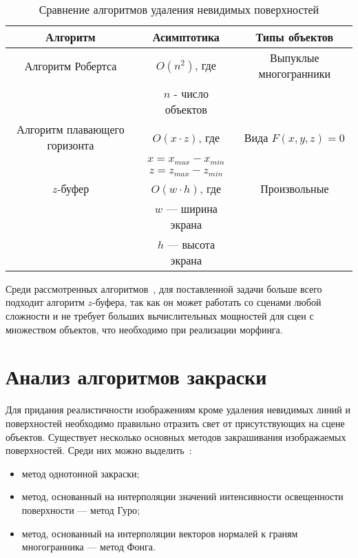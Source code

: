 \begin{table}[ht]
	\small
	\begin{center}
		\begin{threeparttable}
			\caption{Сравнение алгоритмов удаления невидимых поверхностей}
			\label{tbl:test_rem_faces}
			\begin{tabular}{|c|c|c|}
				\hline
				\bfseries Алгоритм & \bfseries Асимптотика & \bfseries Типы объектов \\
				\hline
				Алгоритм Робертса & $O(n^2)$, где & Выпуклые многогранники \\
				& $n$ - число объектов & \\
				\hline
				Алгоритм плавающего горизонта & $O(x \cdot z)$, где & Вида $F(x, y, z) = 0$ \\
				& $x = x_{max} - x_{min}$ & \\
				& $z = z_{max} - z_{min}$ & \\
				\hline
				$z$-буфер & $O(w \cdot h)$, где & Произвольные \\
				& $w$ --- ширина экрана & \\
				& $h$ --- высота экрана & \\
				\hline
			\end{tabular}
		\end{threeparttable}
	\end{center}
\end{table}

Среди рассмотренных алгоритмов~\cite{REMOVE_FACES, ZBuff}, для поставленной задачи больше всего подходит алгоритм $z$-буфера, так как он может работать со сценами любой сложности и не требует больших вычислительных мощностей для сцен с множеством объектов, что необходимо при реализации морфинга.

\newpage

\section{Анализ алгоритмов закраски}

Для придания реалистичности изображениям кроме удаления невидимых линий и поверхностей необходимо правильно отразить свет от присутствующих на сцене объектов. Существует несколько основных методов закрашивания изображаемых поверхностей. Среди них можно выделить~\cite{FILL_FACES}:

\begin{itemize}[label*=---]
	\item метод однотонной закраски;
	\item метод, основанный на интерполяции значений интенсивности освещенности поверхности --- метод Гуро;
	\item метод, основанный на интерполяции векторов нормалей к граням многогранника --- метод Фонга.
\end{itemize}

